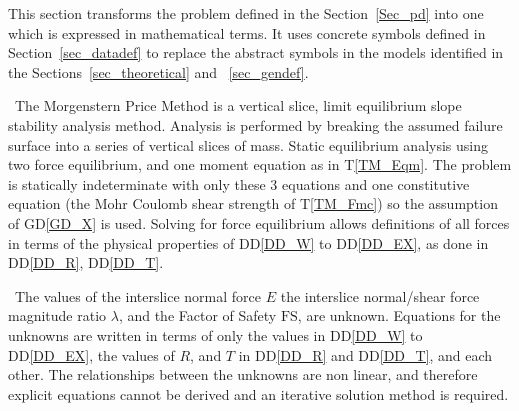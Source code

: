 \documentclass[12pt]{article}
\newcommand{\tref}[1]{T\ref{#1}}
\newcommand{\ddref}[1]{DD\ref{#1}}
\newcommand{\dref}[1]{GD\ref{#1}}
\begin{document}
This section transforms the problem defined in the
Section~\ref{Sec_pd} into one which is expressed in mathematical
terms. It uses concrete symbols defined in Section~\ref{sec_datadef}
to replace the abstract symbols in the models identified in the
Sections~\ref{sec_theoretical} and ~\ref{sec_gendef}.

~\newline\noindent The Morgenstern Price Method is a vertical slice,
limit equilibrium slope stability analysis method. Analysis is
performed by breaking the assumed failure surface into a series of
vertical slices of mass. Static equilibrium analysis using two force
equilibrium, and one moment equation as in \tref{TM_Eqm}. The problem
is statically indeterminate with only these 3 equations and one
constitutive equation (the Mohr Coulomb shear strength of
\tref{TM_Fmc}) so the assumption of \dref{GD_X} is used. Solving for
force equilibrium allows definitions of all forces in terms of the
physical properties of \ddref{DD_W} to \ddref{DD_EX}, as done in
\ddref{DD_R}, \ddref{DD_T}.

~\newline\noindent The values of the interslice normal force $E$ the
interslice normal/shear force magnitude ratio $\lambda$, and the
Factor of Safety $\text{FS}$, are unknown. Equations for the unknowns
are written in terms of only the values in \ddref{DD_W} to
\ddref{DD_EX}, the values of $R$, and $T$ in
\ddref{DD_R} and \ddref{DD_T}, and each other. The relationships
between the unknowns are non linear, and therefore explicit equations
cannot be derived and an iterative solution method is required.


~\newline

\end{document}
